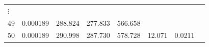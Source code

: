 \documentclass[]{book}
\begin{document}
\begin{enumerate}
\begin{longtable}[]{@{}llllllll@{}}
\begin{minipage}[t]{0.11\columnwidth}
  \(\vdots\)\strut
  \end{minipage}\tabularnewline
  \begin{minipage}[t]{0.02\columnwidth}\raggedright
  49\strut
  \end{minipage} & \begin{minipage}[t]{0.12\columnwidth}\raggedright
  0.000189\strut
  \end{minipage} & \begin{minipage}[t]{0.07\columnwidth}\raggedright
  288.824\strut
  \end{minipage} & \begin{minipage}[t]{0.07\columnwidth}\raggedright
  277.833\strut
  \end{minipage} & \begin{minipage}[t]{0.10\columnwidth}\raggedright
  566.658\strut
  \end{minipage} & \begin{minipage}[t]{0.20\columnwidth}\raggedright
  \strut
  \end{minipage} & \begin{minipage}[t]{0.10\columnwidth}\raggedright
  \strut
  \end{minipage} & \begin{minipage}[t]{0.11\columnwidth}\raggedright
  \strut
  \end{minipage}\tabularnewline
  \begin{minipage}[t]{0.02\columnwidth}\raggedright
  50\strut
  \end{minipage} & \begin{minipage}[t]{0.12\columnwidth}\raggedright
  0.000189\strut
  \end{minipage} & \begin{minipage}[t]{0.07\columnwidth}\raggedright
  290.998\strut
  \end{minipage} & \begin{minipage}[t]{0.07\columnwidth}\raggedright
  287.730\strut
  \end{minipage} & \begin{minipage}[t]{0.10\columnwidth}\raggedright
  578.728\strut
  \end{minipage} & \begin{minipage}[t]{0.20\columnwidth}\raggedright
  12.071\strut
  \end{minipage} & \begin{minipage}[t]{0.10\columnwidth}\raggedright
  0.0211\strut
  \end{minipage} & \begin{minipage}[t]{0.11\columnwidth}\raggedright

\end{minipage}
\end{longtable}
\end{enumerate}
\end{document}
